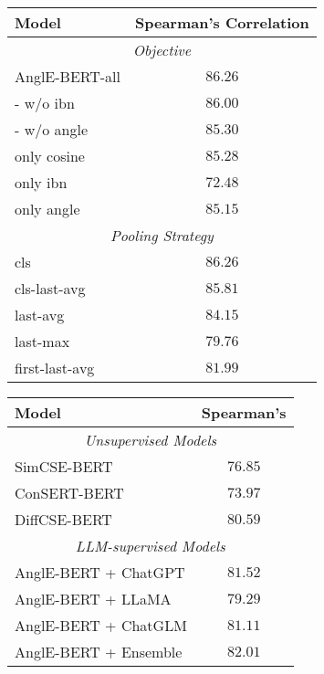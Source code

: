 \documentclass{article} \usepackage{iclr2024_conference,times}
\begin{document}
\begin{minipage}[l]{0.5\textwidth}
    \centering
    \small
    \begin{tabular}{lc}
        \toprule
        Model & Spearman's Correlation \\
        \midrule
        \midrule
        \multicolumn{2}{c}{\textit{Objective}} \\
        \midrule
        AnglE-BERT-all & $\mathbf{86.26}$ \\
        - w/o ibn & $86.00$ \\
        - w/o angle & $85.30$ \\
        only cosine & $85.28$ \\
        only ibn & $72.48$ \\
        only angle & $85.15$ \\
        \midrule
        \midrule
        \multicolumn{2}{c}{\textit{Pooling Strategy}} \\
        \midrule
        cls & $\mathbf{86.26}$ \\
        cls-last-avg & $85.81$ \\
        last-avg & $84.15$ \\
        last-max & $79.76$ \\
        first-last-avg & $81.99$ \\
        \bottomrule
    \end{tabular}
    \label{table-ablation-study-results}
\end{minipage}
\begin{minipage}[l]{0.5\textwidth}
    \centering
    \small
    \begin{tabular}{lc}
        \toprule
        Model & Spearman's \\
        \midrule
        \midrule
        \multicolumn{2}{c}{\textit{Unsupervised Models}} \\
        \midrule
        SimCSE-BERT & $76.85$ \\
        ConSERT-BERT & $73.97$ \\
        DiffCSE-BERT & $80.59$ \\
        \midrule
        \midrule
        \multicolumn{2}{c}{\textit{LLM-supervised Models}} \\
        \midrule
        AnglE-BERT + ChatGPT & $81.52$ \\
        AnglE-BERT + LLaMA & $79.29$ \\
        AnglE-BERT + ChatGLM & $81.11$ \\
        AnglE-BERT + Ensemble & $\mathbf{82.01}$ \\
        \bottomrule
    \end{tabular}
    \label{table-supervised-learning-results}
\end{minipage}
\end{document}

